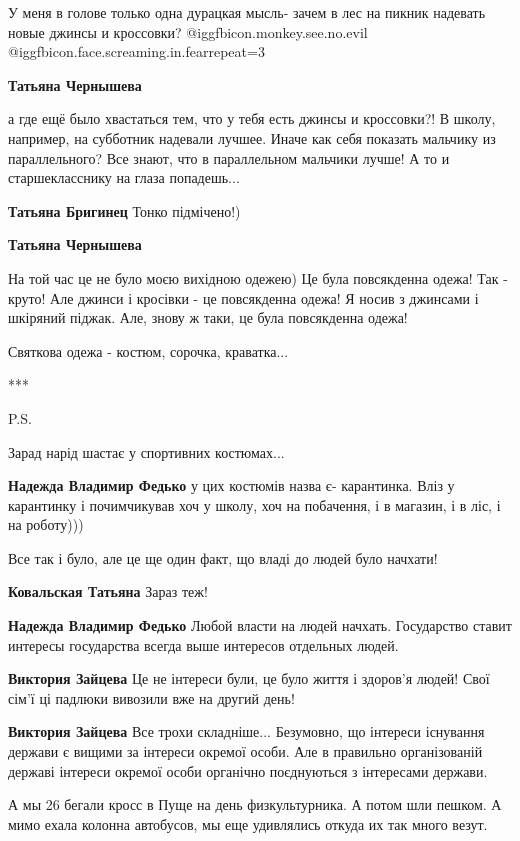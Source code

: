 \begin{itemize}

У меня в голове только одна дурацкая мысль- зачем в лес на пикник надевать
новые джинсы и кроссовки? @igg{fbicon.monkey.see.no.evil}  @igg{fbicon.face.screaming.in.fear}{repeat=3} 

\begin{itemize} %
\textbf{Татьяна Чернышева} 

а где ещё было хвастаться тем, что у тебя есть джинсы и кроссовки?! В школу,
например, на субботник надевали лучшее. Иначе как себя показать мальчику из
параллельного? Все знают, что в параллельном мальчики лучше! А то и
старшекласснику на глаза попадешь...


\textbf{Татьяна Бригинец} Тонко підмічено!)

\textbf{Татьяна Чернышева} 

На той час це не було моєю вихідною одежею) Це була повсякденна одежа! Так -
круто! Але джинси і кросівки - це повсякденна одежа! Я носив з джинсами і
шкіряний піджак. Але, знову ж таки, це була повсякденна одежа!

Святкова одежа - костюм, сорочка, краватка...

***

P.S.

Зарад нарід шастає у спортивних костюмах...

\begin{itemize} %
\textbf{Надежда Владимир Федько} у цих костюмів назва є- карантинка. Вліз у карантинку і почимчикував хоч у школу, хоч на побачення, і в магазин, і в ліс, і на роботу)))
\end{itemize} %

\end{itemize} %

Все так і було, але це ще один факт, що владі до людей було начхати!

\begin{itemize} %
\textbf{Ковальская Татьяна} Зараз теж!

\textbf{Надежда Владимир Федько} Любой власти на людей начхать. Государство ставит интересы государства всегда выше интересов отдельных людей.

\textbf{Виктория Зайцева} Це не інтереси були, це було життя і здоров'я людей! Свої сім'ї ці падлюки вивозили вже на другий день!

\textbf{Виктория Зайцева} Все трохи складніше... Безумовно, що інтереси існування держави є вищими за інтереси окремої особи.
Але в правильно організованій державі інтереси окремої особи органічно поєднуються з інтересами держави.
\end{itemize} %


А мы 26 бегали кросс в Пуще на день физкультурника. А потом шли пешком. А мимо
ехала колонна автобусов, мы еще удивлялись откуда их так много везут.

\end{itemize} %
